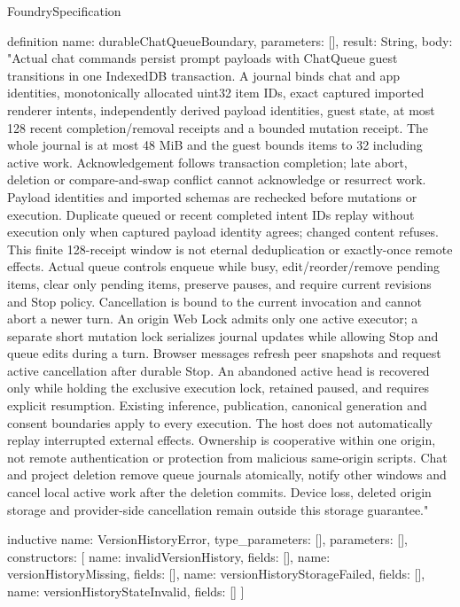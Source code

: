 \begin{lexlean}{FoundrySpecification}
\begin{semanticmodule}
definition{
  name: durableChatQueueBoundary,
  parameters: [],
  result: String,
  body: "Actual chat commands persist prompt payloads with ChatQueue guest transitions in one IndexedDB transaction. A journal binds chat and app identities, monotonically allocated uint32 item IDs, exact captured imported renderer intents, independently derived payload identities, guest state, at most 128 recent completion/removal receipts and a bounded mutation receipt. The whole journal is at most 48 MiB and the guest bounds items to 32 including active work. Acknowledgement follows transaction completion; late abort, deletion or compare-and-swap conflict cannot acknowledge or resurrect work. Payload identities and imported schemas are rechecked before mutations or execution. Duplicate queued or recent completed intent IDs replay without execution only when captured payload identity agrees; changed content refuses. This finite 128-receipt window is not eternal deduplication or exactly-once remote effects. Actual queue controls enqueue while busy, edit/reorder/remove pending items, clear only pending items, preserve pauses, and require current revisions and Stop policy. Cancellation is bound to the current invocation and cannot abort a newer turn. An origin Web Lock admits only one active executor; a separate short mutation lock serializes journal updates while allowing Stop and queue edits during a turn. Browser messages refresh peer snapshots and request active cancellation after durable Stop. An abandoned active head is recovered only while holding the exclusive execution lock, retained paused, and requires explicit resumption. Existing inference, publication, canonical generation and consent boundaries apply to every execution. The host does not automatically replay interrupted external effects. Ownership is cooperative within one origin, not remote authentication or protection from malicious same-origin scripts. Chat and project deletion remove queue journals atomically, notify other windows and cancel local active work after the deletion commits. Device loss, deleted origin storage and provider-side cancellation remain outside this storage guarantee."
}

inductive{
  name: VersionHistoryError,
  type_parameters: [],
  parameters: [],
  constructors: [
    {name: invalidVersionHistory, fields: []},
    {name: versionHistoryMissing, fields: []},
    {name: versionHistoryStorageFailed, fields: []},
    {name: versionHistoryStateInvalid, fields: []}
  ]
}


\end{semanticmodule}
\end{lexlean}
